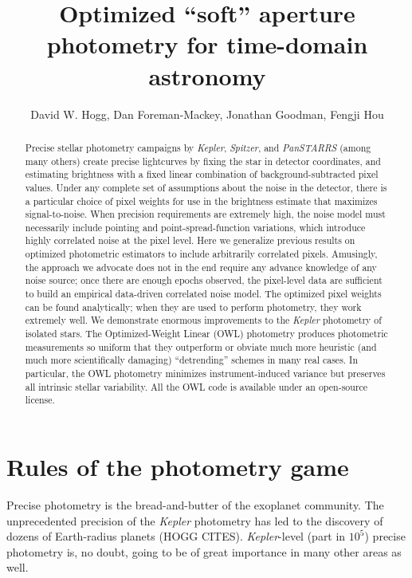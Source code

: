 \documentclass[12pt, letterpaper, preprint]{aastex}
\newcommand{\project}[1]{\textsl{#1}}
\begin{document}
\sloppy\sloppypar

\title{
  Optimized ``soft'' aperture photometry for time-domain astronomy
}
\author{
  David W. Hogg,
  Dan Foreman-Mackey,
  Jonathan Goodman,
  Fengji Hou
}

\begin{abstract}
Precise stellar photometry campaigns by \project{Kepler}, \project{Spitzer}, and \project{PanSTARRS}
  (among many others)
  create precise lightcurves by fixing the star in detector coordinates,
  and estimating brightness with a fixed linear combination of background-subtracted pixel values.
Under any complete set of assumptions about the noise in the detector,
  there is a particular choice of pixel weights for use in the brightness estimate
  that maximizes signal-to-noise.
When precision requirements are extremely high,
  the noise model must necessarily include pointing and point-spread-function variations,
  which introduce highly correlated noise at the pixel level.
Here we generalize previous results on optimized photometric estimators
  to include arbitrarily correlated pixels.
Amusingly, the approach we advocate does not in the end
  require any advance knowledge of any noise source;
  once there are enough epochs observed,
  the pixel-level data are sufficient to build an empirical data-driven correlated noise model.
The optimized pixel weights can be found analytically;
  when they are used to perform photometry, they work extremely well.
We demonstrate enormous improvements to the \project{Kepler} photometry of isolated stars.
The Optimized-Weight Linear (OWL) photometry produces photometric measurements so uniform that
  they outperform or obviate much more heuristic (and much more scientifically damaging)
  ``detrending'' schemes in many real cases.
In particular, the OWL photometry minimizes instrument-induced variance
  but preserves all intrinsic stellar variability.
All the OWL code is available under an open-source license.
\end{abstract}


\section{Rules of the photometry game}

Precise photometry is the bread-and-butter of the exoplanet community.
The unprecedented precision of the \project{Kepler} photometry has led to the discovery of
dozens of Earth-radius planets (HOGG CITES).
\project{Kepler}-level (part in $10^5$) precise photometry is, no doubt,
  going to be of great importance in many other areas as well.
\end{document}
